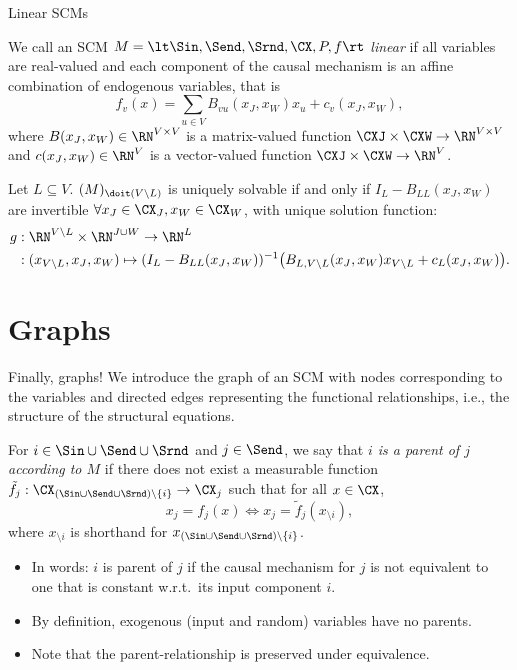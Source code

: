 \begin{frame}{Linear SCMs}
  \begin{Def}
We call an SCM $M=\lt \Sin, \Send, \Srnd, \CX, P, f \rt$
\emph{linear} if all variables are real-valued and
each component of the causal mechanism is an affine combination of endogenous variables, that is
$$
    f_v(x) = \sum_{u\in V} B_{vu}(x_J,x_W) x_u + c_v(x_J,x_W),
$$
    where $B(x_J,x_W)\in\RN^{V \times V}$ is a matrix-valued function $\CXJ\times\CXW \to \RN^{V\times V}$ and
$c(x_J,x_W) \in \RN^V$ is a vector-valued function $\CXJ\times\CXW \to \RN^V$.
  \end{Def}

  \begin{Prp}
Let $L \subseteq V$.
$(M)_{\doit(V\setminus L)}$ is uniquely solvable if and only if 
$I_{L}-B_{LL}(x_J,x_W)$ are invertible $\forall x_J \in \CX_J, x_W \in \CX_W$,
with unique solution function:
\small
  \begin{equation*}\begin{split}
    g &: \RN^{V\setminus L} \times \RN^{J\cup W} \to \RN^L \\
      &: (x_{V\setminus L},x_J,x_W) \mapsto (I_L - B_{LL}(x_J,x_W))^{-1} \big(B_{L,{V\setminus L}}(x_J,x_W) x_{V\setminus L} + c_{L}(x_J,x_W)\big).
  \end{split}\end{equation*}
  \end{Prp}
\end{frame}

\part{Graphs}
\frame{\partpage}

\begin{frame}{Finally, graphs!}
  We introduce the graph of an SCM with nodes corresponding to the variables and directed edges representing the functional relationships, i.e., the structure of the structural equations.
  
  \begin{Def}
  For $i \in \Sin \cup \Send \cup \Srnd$ and $j \in \Send$, we say that
  \emph{$i$ is a parent of $j$ according to $M$} if there does not exist a measurable function
  $\tilde f_j : \CX_{(\Sin\cup\Send\cup\Srnd) \setminus \{i\}} \to \CX_j$
  such that for all $x \in \CX$,
  $$x_j = f_j(x) \iff x_j = \tilde f_j(x_{\setminus i}),$$
  where $x_{\setminus i}$ is shorthand for $x_{(\Sin\cup\Send\cup\Srnd)\setminus\{i\}}$.
\end{Def}
  \begin{itemize}
    \item In words: $i$ is parent of $j$ if the causal mechanism for $j$ is not equivalent to one that is constant w.r.t.\ its input component $i$.
    \item By definition, exogenous (input and random) variables have no parents.
    \item Note that the parent-relationship is preserved under equivalence.
  \end{itemize}
\end{frame}

